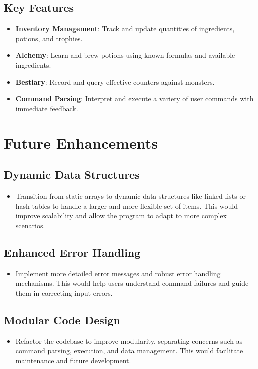 \documentclass{article}
\begin{document}
\subsection*{Key Features}
\begin{itemize}
    \item \textbf{Inventory Management}: Track and update quantities of ingredients, potions, and trophies.
    \item \textbf{Alchemy}: Learn and brew potions using known formulas and available ingredients.
    \item \textbf{Bestiary}: Record and query effective counters against monsters.
    \item \textbf{Command Parsing}: Interpret and execute a variety of user commands with immediate feedback.
\end{itemize}

\section*{Future Enhancements}

\subsection*{Dynamic Data Structures}
\begin{itemize}
    \item Transition from static arrays to dynamic data structures like linked lists or hash tables to handle a larger and more flexible set of items. This would improve scalability and allow the program to adapt to more complex scenarios.
\end{itemize}


\subsection*{Enhanced Error Handling}
\begin{itemize}
    \item Implement more detailed error messages and robust error handling mechanisms. This would help users understand command failures and guide them in correcting input errors.
\end{itemize}

\subsection*{Modular Code Design}
\begin{itemize}
    \item Refactor the codebase to improve modularity, separating concerns such as command parsing, execution, and data management. This would facilitate maintenance and future development.
\end{itemize}
\end{document}
